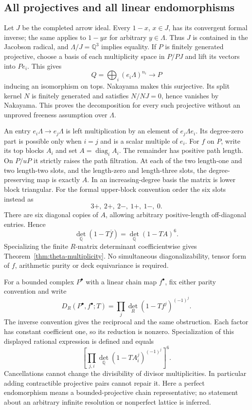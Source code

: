 \subsection{All projectives and all linear endomorphisms}
Let $J$ be the completed arrow ideal. Every $1-x$, $x\in J$, has its convergent formal inverse; the same applies to $1-yx$ for arbitrary $y\in\Lambda$. Thus $J$ is contained in the Jacobson radical, and $\Lambda/J=\mathbb Q^3$ implies equality. If $P$ is finitely generated projective, choose a basis of each multiplicity space in $P/PJ$ and lift its vectors into $Pe_i$. This gives
\[
 Q=\bigoplus_i(e_i\Lambda)^{n_i}\longrightarrow P
\]
inducing an isomorphism on tops. Nakayama makes this surjective. Its split kernel $N$ is finitely generated and satisfies $N/NJ=0$, hence vanishes by Nakayama. This proves the decomposition for every such projective without an unproved freeness assumption over $\Lambda$.

An entry $e_i\Lambda\to e_j\Lambda$ is left multiplication by an element of $e_j\Lambda e_i$. Its degree-zero part is possible only when $i=j$ and is a scalar multiple of $e_i$. For $f$ on $P$, write its top blocks $A_i$ and set $A=\operatorname{diag}_iA_i$. The remainder has positive path length. On $P/uP$ it strictly raises the path filtration. At each of the two length-one and two length-two slots, and the length-zero and length-three slots, the degree-preserving map is exactly $A$. In an increasing-degree basis the matrix is lower block triangular. For the formal upper-block convention order the six slots instead as
\[
 3+,\ 2+,\ 2-,\ 1+,\ 1-,\ 0.
\]
There are six diagonal copies of $A$, allowing arbitrary positive-length off-diagonal entries. Hence
\[
 \det_{\mathbb Q}(1-T\overline f)=\det_{\mathbb Q}(1-TA)^6.
\]
Specializing the finite $R$-matrix determinant coefficientwise gives Theorem~\ref{thm:theta-multiplicity}. No simultaneous diagonalizability, tensor form of $f$, arithmetic purity or deck equivariance is required.

For a bounded complex $P^\bullet$ with a linear chain map $f^\bullet$, fix either parity convention and write
\[
 D_R(P^\bullet,f^\bullet;T)=\prod_j\det_R(1-Tf^j)^{(-1)^j}.
\]
The inverse convention gives the reciprocal and the same obstruction. Each factor has constant coefficient one, so its reduction is nonzero. Specialization of this displayed rational expression is defined and equals
\[
 \left[\prod_{j,i}\det_{\mathbb Q}(1-TA_i^j)^{(-1)^j}\right]^6.
\]
Cancellations cannot change the divisibility of divisor multiplicities. In particular adding contractible projective pairs cannot repair it. Here a perfect endomorphism means a bounded-projective chain representative; no statement about an arbitrary infinite resolution or nonperfect lattice is inferred.

